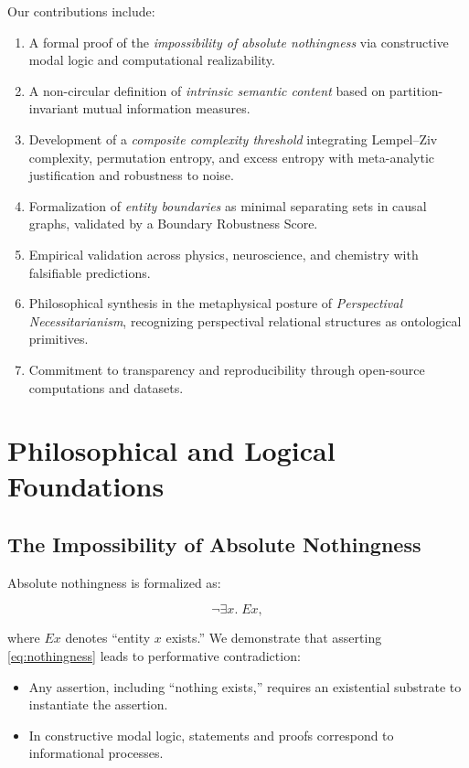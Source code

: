 \documentclass[12pt,a4paper]{article}
\begin{document}
Our contributions include:  
\begin{enumerate}
\item A formal proof of the \emph{impossibility of absolute nothingness} via constructive modal logic and computational realizability.
\item A non-circular definition of \emph{intrinsic semantic content} based on partition-invariant mutual information measures.
\item Development of a \emph{composite complexity threshold} integrating Lempel–Ziv complexity, permutation entropy, and excess entropy with meta-analytic justification and robustness to noise.
\item Formalization of \emph{entity boundaries} as minimal separating sets in causal graphs, validated by a Boundary Robustness Score.
\item Empirical validation across physics, neuroscience, and chemistry with falsifiable predictions.
\item Philosophical synthesis in the metaphysical posture of \emph{Perspectival Necessitarianism}, recognizing perspectival relational structures as ontological primitives.
\item Commitment to transparency and reproducibility through open-source computations and datasets.
\end{enumerate}

\section{Philosophical and Logical Foundations}

\subsection{The Impossibility of Absolute Nothingness}

Absolute nothingness is formalized as:

\begin{equation}\label{eq:nothingness}
\neg \exists x.\; Ex,
\end{equation}

where $Ex$ denotes “entity $x$ exists.” We demonstrate that asserting \eqref{eq:nothingness} leads to performative contradiction:

\begin{itemize}
    \item Any assertion, including “nothing exists,” requires an existential substrate to instantiate the assertion.
    \item In constructive modal logic, statements and proofs correspond to informational processes.
\end{itemize}
\end{document}
